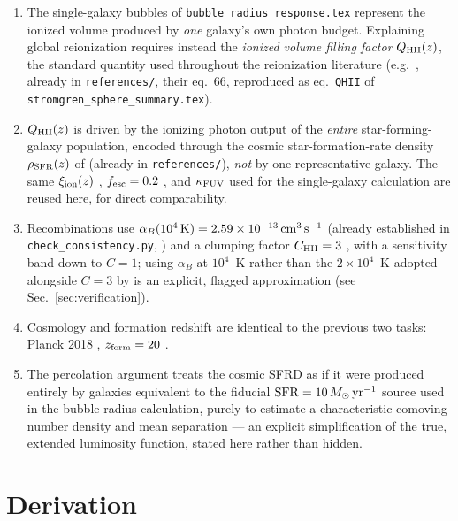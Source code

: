 \documentclass[11pt,a4paper]{article}
\newcommand{\Msun}{\,M_\odot}
\begin{document}
\begin{enumerate}
\item The single-galaxy bubbles of \texttt{bubble\_radius\_response.tex} represent the ionized volume
      produced by \emph{one} galaxy's own photon budget. Explaining global reionization requires instead the
      \emph{ionized volume filling factor} $Q_{\rm HII}(z)$, the standard quantity used throughout the
      reionization literature (e.g.\ \citealt{Choudhury2022}, already in \texttt{references/}, their eq.~66,
      reproduced as eq.~\texttt{QHII} of \texttt{stromgren\_sphere\_summary.tex}).
\item $Q_{\rm HII}(z)$ is driven by the ionizing photon output of the \emph{entire} star-forming-galaxy
      population, encoded through the cosmic star-formation-rate density $\rho_{\rm SFR}(z)$ of
      \citet{MadauDickinson2014} (already in \texttt{references/}), \emph{not} by one representative galaxy.
      The same $\xi_{\rm ion}(z)$ \citep{Llerena2024}, $f_{\rm esc}=0.2$ \citep{Robertson2015}, and
      $\kappa_{\rm FUV}$ \citep{MadauDickinson2014} used for the single-galaxy calculation are reused here,
      for direct comparability.
\item Recombinations use $\alpha_B(10^4\,{\rm K})=2.59\times10^{-13}\,{\rm cm^3\,s^{-1}}$ (already established
      in \texttt{check\_consistency.py}, \citealt{Shapiro2006}) and a clumping factor $C_{\rm HII}=3$
      \citep{Robertson2015}, with a sensitivity band down to $C=1$; using $\alpha_B$ at $10^4$~K rather than
      the $2\times10^4$~K adopted alongside $C=3$ by \citet{Robertson2015} is an explicit, flagged
      approximation (see Sec.~\ref{sec:verification}).
\item Cosmology and formation redshift are identical to the previous two tasks: Planck 2018
      \citep{Planck2018VI}, $z_{\rm form}=20$ \citep{Kitayama2004}.
\item The percolation argument treats the cosmic SFRD as if it were produced entirely by galaxies
      equivalent to the fiducial $\mathrm{SFR}=10\Msun\,{\rm yr^{-1}}$ source used in the bubble-radius
      calculation, purely to estimate a characteristic comoving number density and mean separation --- an
      explicit simplification of the true, extended luminosity function, stated here rather than hidden.
\end{enumerate}

\section{Derivation}
\label{sec:derivation}
\end{document}
